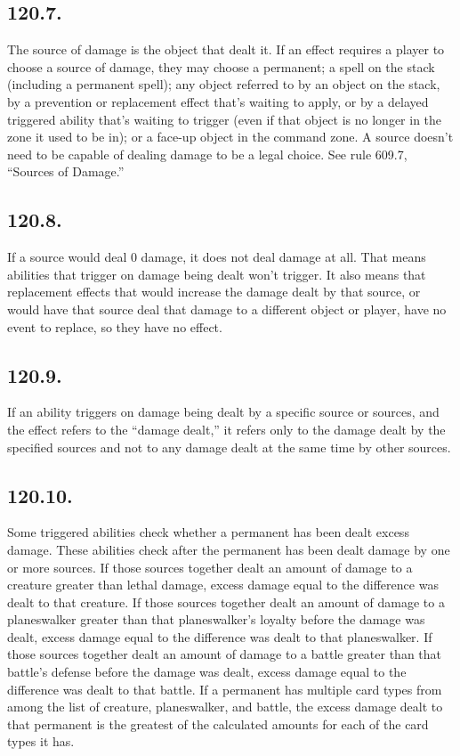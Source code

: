 \subsection*{120.7.}
The source of damage is the object that dealt it. If an effect requires a player to choose a source of damage, they may choose a permanent; a spell on the stack (including a permanent spell); any object referred to by an object on the stack, by a prevention or replacement effect that’s waiting to apply, or by a delayed triggered ability that’s waiting to trigger (even if that object is no longer in the zone it used to be in); or a face-up object in the command zone. A source doesn’t need to be capable of dealing damage to be a legal choice. See rule 609.7, “Sources of Damage.”

\subsection*{120.8.}
If a source would deal 0 damage, it does not deal damage at all. That means abilities that trigger on damage being dealt won’t trigger. It also means that replacement effects that would increase the damage dealt by that source, or would have that source deal that damage to a different object or player, have no event to replace, so they have no effect.

\subsection*{120.9.}
If an ability triggers on damage being dealt by a specific source or sources, and the effect refers to the “damage dealt,” it refers only to the damage dealt by the specified sources and not to any damage dealt at the same time by other sources.

\subsection*{120.10.}
Some triggered abilities check whether a permanent has been dealt excess damage. These abilities check after the permanent has been dealt damage by one or more sources. If those sources together dealt an amount of damage to a creature greater than lethal damage, excess damage equal to the difference was dealt to that creature. If those sources together dealt an amount of damage to a planeswalker greater than that planeswalker’s loyalty before the damage was dealt, excess damage equal to the difference was dealt to that planeswalker. If those sources together dealt an amount of damage to a battle greater than that battle’s defense before the damage was dealt, excess damage equal to the difference was dealt to that battle. If a permanent has multiple card types from among the list of creature, planeswalker, and battle, the excess damage dealt to that permanent is the greatest of the calculated amounts for each of the card types it has.

